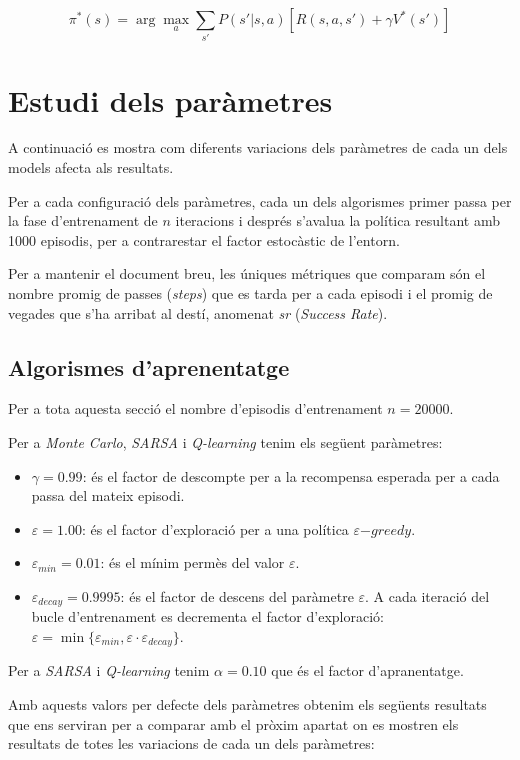 \documentclass[12pt,a4paper]{report}
\begin{document}
\[
  \pi^*(s) = \arg\max_a \sum_{s'} P(s'|s,a) \left[ R(s,a,s') + \gamma V^*(s') \right]
\]

\chapter{Estudi dels paràmetres}
\label{ch:parameters}

A continuació es mostra com diferents variacions dels paràmetres de cada un dels models afecta als resultats.

Per a cada configuració dels paràmetres, cada un dels algorismes primer passa per la fase d'entrenament de
$n$ iteracions i després s'avalua la política resultant amb 1000 episodis, per a contrarestar el factor estocàstic de l'entorn.

Per a mantenir el document breu, les úniques métriques que comparam són el nombre promig de passes (\textit{steps}) que es tarda per a cada episodi
i el promig de vegades que s'ha arribat al destí, anomenat \textit{sr} (\textit{Success Rate}).

\section{Algorismes d'aprenentatge}

Per a tota aquesta secció el nombre d'episodis d'entrenament $n = 20000$.

Per a \textit{Monte Carlo}, \textit{SARSA} i \textit{Q-learning} tenim els següent paràmetres:
\begin{itemize}
  \item $\gamma = 0.99$: és el factor de descompte per a la recompensa esperada per a cada passa del mateix episodi.
  \item $\varepsilon = 1.00$: és el factor d'exploració per a una política $\varepsilon\mathit{-greedy}$.
  \item $\varepsilon_{min} = 0.01$: és el mínim permès del valor $\varepsilon$.
  \item $\varepsilon_{decay} = 0.9995$: és el factor de descens del paràmetre $\varepsilon$.
  A cada iteració del bucle d'entrenament es decrementa el factor d'exploració: $\varepsilon = \min\{\varepsilon_{min}, \varepsilon \cdot \varepsilon_{decay} \}$.
\end{itemize}

Per a \textit{SARSA} i \textit{Q-learning} tenim $\alpha = 0.10$ que és el factor d'apranentatge.

Amb aquests valors per defecte dels paràmetres obtenim els següents resultats que ens serviran per a comparar
amb el pròxim apartat on es mostren els resultats de totes les variacions de cada un dels paràmetres:
\end{document}
